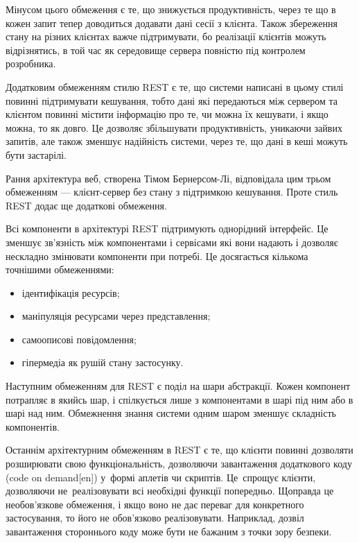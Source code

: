 \documentclass[../main.tex]{subfiles}
\begin{document}
		Мінусом цього обмеження є те, що знижується продуктивність, через те що в кожен запит тепер доводиться додавати дані сесії з клієнта. Також збереження стану на різних клієнтах важче підтримувати, бо реалізації клієнтів можуть відрізнятись, в той час як середовище сервера повністю під контролем розробника.
		
		Додатковим обмеженням стилю REST є те, що системи написані в цьому стилі повинні підтримувати кешування, тобто дані які передаються між сервером та клієнтом повинні містити інформацію про те, чи можна їх кешувати, і якщо можна, то як довго. Це дозволяє збільшувати продуктивність, уникаючи зайвих запитів, але також зменшує надійність системи, через те, що дані в кеші можуть бути застарілі.
		
		Рання архітектура веб, створена Тімом Бернерсом-Лі, відповідала цим трьом обмеженням — клієнт-сервер без стану з підтримкою кешування. Проте стиль REST додає ще додаткові обмеження.
		
		Всі компоненти в архітектурі REST підтримують однорідний інтерфейс. Це зменшує зв'язність між компонентами і сервісами які вони надають і дозволяє нескладно змінювати компоненти при потребі. Це досягається кількома точнішими обмеженнями:
		
		\begin{itemize}
			\item ідентифікація ресурсів;
			\item маніпуляція ресурсами через представлення;
			\item самоописові повідомлення;
			\item гіпермедіа як рушій стану застосунку.
		\end{itemize}
		
		Наступним обмеженням для REST є поділ на шари абстракції. Кожен компонент потрапляє в якийсь шар, і спілкується лише з компонентами в шарі під ним або в шарі над ним. Обмежнення знання системи одним шаром зменшує складність компонентів.
		
		Останнім архітектурним обмеженням в REST є те, що клієнти повинні дозволяти розширювати свою функціональність, дозволяючи завантаження додаткового коду (code on demand[en]) у~формі аплетів чи скриптів. Це~спрощує клієнти, дозволяючи не~реалізовувати всі необхідні функції попередньо. Щоправда це необов'язкове обмеження, і якщо воно не дає переваг для конкретного застосування, то його не обов'язково реалізовувати. Наприклад, дозвіл завантаження стороннього коду може бути не бажаним з точки зору безпеки.
		
\end{document}
